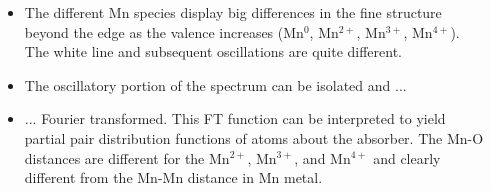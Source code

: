 \documentclass[10pt, xcolor=x11names, compress]{beamer}
\begin{document}
\begin{frame}
\begin{columns}[T]
\begin{column}{0.34\linewidth}
    \end{column}
    \begin{column}{0.66\linewidth}
      \begin{itemize}[<+->]
      \item The different Mn species display big differences in the
        fine structure beyond the edge as the valence increases
        ({\color{Blue3}Mn$^0$}, \alert{Mn$^{2+}$},
        {\color{Green4}Mn$^{3+}$}, {\color{Purple3}Mn$^{4+}$}).  The
        white line and subsequent oscillations are quite
        different.\\[6ex]
      \item The oscillatory portion of the spectrum can be isolated
        and ...\\[6ex]
      \item ... Fourier transformed.  This FT function can be
        interpreted to yield partial pair distribution functions of
        atoms about the absorber.  The Mn-O distances are different
        for the \alert{Mn$^{2+}$}, {\color{Green4}Mn$^{3+}$}, and
        {\color{Purple3}Mn$^{4+}$} and clearly different from the
        Mn-Mn distance in {\color{Blue3}Mn metal}.
      \end{itemize}
    \end{column}
  \end{columns}
\end{frame}
\end{document}
